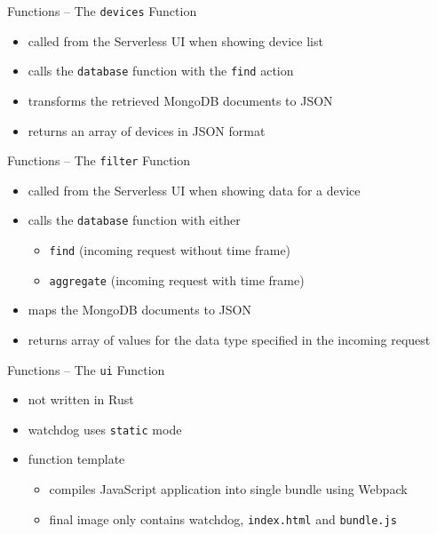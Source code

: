 \begin{frame}{Functions -- The \texttt{devices} Function}
  \begin{itemize}
    \item called from the Serverless UI when showing device list
    \item calls the \texttt{database} function with the \texttt{find} action
    \item transforms the retrieved MongoDB documents to JSON
    \item returns an array of devices in JSON format
  \end{itemize}
\end{frame}

\begin{frame}{Functions -- The \texttt{filter} Function}
  \begin{itemize}
    \item called from the Serverless UI when showing data for a device
    \item calls the \texttt{database} function with either
      \begin{itemize}
        \item \texttt{find} (incoming request without time frame)
        \item \texttt{aggregate} (incoming request with time frame)
      \end{itemize}
    \item maps the MongoDB documents to JSON
    \item returns array of values for the data type specified in the incoming request
  \end{itemize}
\end{frame}

\begin{frame}{Functions -- The \texttt{ui} Function}
  \begin{itemize}
    \item not written in Rust
    \item watchdog uses \texttt{static} mode
    \item function template
    \begin{itemize}
      \item compiles JavaScript application into single bundle using Webpack
      \item final image only contains watchdog, \texttt{index.html} and \texttt{bundle.js}
    \end{itemize}
  \end{itemize}
\end{frame}
